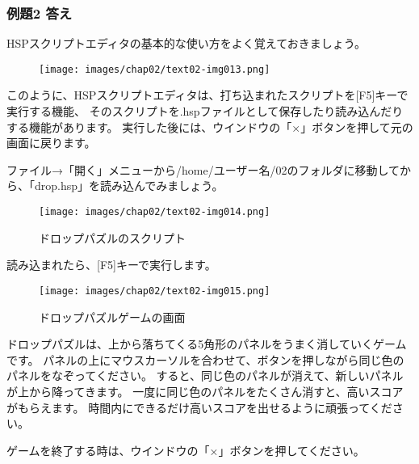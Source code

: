 \subsubsection*{例題2 答え}

HSPスクリプトエディタの基本的な使い方をよく覚えておきましょう。

\begin{figure}[H]
  \begin{center}
    \texttt{[image: images/chap02/text02-img013.png]}
  \end{center}
  \label{fig:hsed_chart}
\end{figure}

\noindent
このように、HSPスクリプトエディタは、打ち込まれたスクリプトを[F5]キーで実行する機能、
そのスクリプトを.hspファイルとして保存したり読み込んだりする機能があります。
実行した後には、ウインドウの「×」ボタンを押して元の画面に戻ります。

ファイル→「開く」メニューから/home/ユーザー名/02のフォルダに移動してから、「drop.hsp」を読み込んでみましょう。

\begin{figure}[H]
  \begin{center}
    \texttt{[image: images/chap02/text02-img014.png]}
    \caption{ドロップパズルのスクリプト}
  \end{center}
  \label{fig:drop_script}
\end{figure}

\noindent
読み込まれたら、[F5]キーで実行します。

\begin{figure}[H]
  \begin{center}
    \texttt{[image: images/chap02/text02-img015.png]}
    \caption{ドロップパズルゲームの画面}
  \end{center}
  \label{fig:drop_display}
\end{figure}

ドロップパズルは、上から落ちてくる5角形のパネルをうまく消していくゲームです。
パネルの上にマウスカーソルを合わせて、ボタンを押しながら同じ色のパネルをなぞってください。
すると、同じ色のパネルが消えて、新しいパネルが上から降ってきます。
一度に同じ色のパネルをたくさん消すと、高いスコアがもらえます。
時間内にできるだけ高いスコアを出せるように頑張ってください。

ゲームを終了する時は、ウインドウの「×」ボタンを押してください。
\clearpage

